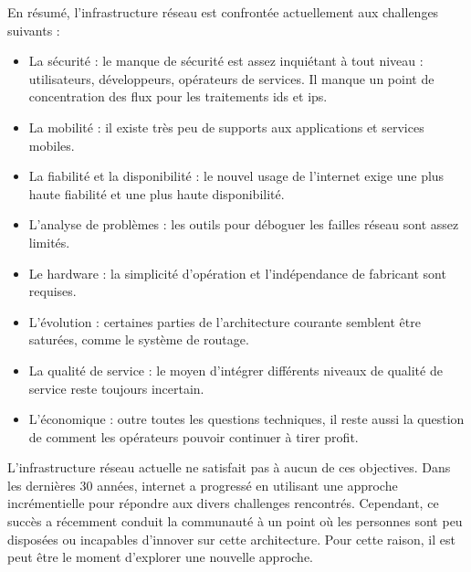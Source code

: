 En résumé, l'infrastructure réseau est confrontée actuellement aux challenges suivants :
\begin{itemize}
\item La sécurité : le manque de sécurité est assez inquiétant à tout niveau : utilisateurs, développeurs, opérateurs de services. Il manque un point de concentration des flux pour les traitements \gls{ids} et \gls{ips}.
\item La mobilité : il existe très peu de supports aux applications et services mobiles.
\item La fiabilité et la disponibilité : le nouvel usage de l'internet exige une plus haute fiabilité et une plus haute disponibilité.
\item L'analyse de problèmes : les outils pour déboguer les failles réseau sont assez limités.


\item Le hardware : la simplicité d'opération et l'indépendance de fabricant sont requises.

\item L'évolution : certaines parties de l'architecture courante semblent être saturées, comme le système de routage.
\item La qualité de service : le moyen d'intégrer différents niveaux de qualité de service reste toujours incertain.
\item L'économique : outre toutes les questions techniques, il reste aussi la question de comment les opérateurs pouvoir continuer à tirer profit.
\end{itemize}
\cite{InernetCleanSlateDesignIntro}

L'infrastructure réseau actuelle ne satisfait pas à aucun de ces objectives. \cite{fabricIntro}  Dans les dernières 30 années, internet a progressé en utilisant une approche incrémentielle pour répondre aux divers challenges rencontrés. Cependant, ce succès a récemment conduit la communauté à un point où les personnes sont peu disposées ou incapables d'innover sur cette architecture. Pour cette raison, il est peut être le moment d'explorer une nouvelle approche. \cite{InernetCleanSlateDesignApproach}

